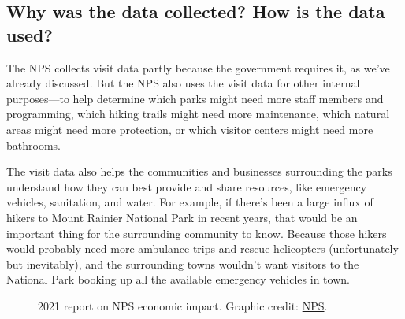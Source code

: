 \documentclass[
  letterpaper,
  DIV=11,
  numbers=noendperiod]{scrartcl}
\begin{document}
\subsection{Why was the data collected? How is the data
used?}\label{why-was-the-data-collected-how-is-the-data-used}

The NPS collects visit data partly because the government requires it,
as we've already discussed. But the NPS also uses the visit data for
other internal purposes---to help determine which parks might need more
staff members and programming, which hiking trails might need more
maintenance, which natural areas might need more protection, or which
visitor centers might need more bathrooms.

The visit data also helps the communities and businesses surrounding the
parks understand how they can best provide and share resources, like
emergency vehicles, sanitation, and water. For example, if there's been
a large influx of hikers to Mount Rainier National Park in recent years,
that would be an important thing for the surrounding community to know.
Because those hikers would probably need more ambulance trips and rescue
helicopters (unfortunately but inevitably), and the surrounding towns
wouldn't want visitors to the National Park booking up all the available
emergency vehicles in town.

\begin{figure}


\caption{\label{fig-economic-benefit}2021 report on NPS economic impact.
Graphic credit: \href{https://www.nps.gov/orgs/1207/vse2020.htm}{NPS}.}

\end{figure}%
\end{document}
